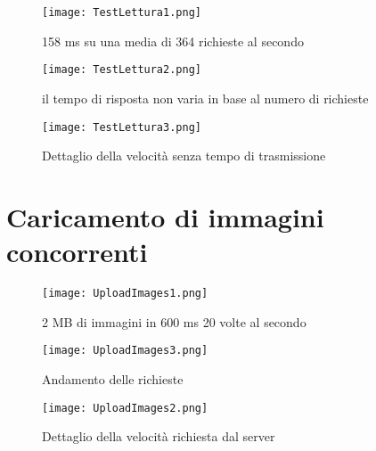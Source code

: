 \begin{figure}[htbp]
    \begin{center}
        \texttt{[image: TestLettura1.png]}
        \caption{158 ms su una media di 364 richieste al secondo}
    \end{center}
\end{figure}

\begin{figure}[htbp]
    \begin{center}
        \texttt{[image: TestLettura2.png]}
        \caption{il tempo di risposta non varia in base al numero di richieste}
    \end{center}
\end{figure}

\begin{figure}[htbp]
    \begin{center}
        \texttt{[image: TestLettura3.png]}
        \caption{Dettaglio della velocità senza tempo di trasmissione}
    \end{center}
\end{figure}
\clearpage
\section{Caricamento di immagini concorrenti}

\begin{figure}[htbp]
    \begin{center}
        \texttt{[image: UploadImages1.png]}
        \caption{2 MB di immagini in 600 ms 20 volte al secondo}  
    \end{center}
\end{figure}

\begin{figure}[htbp]
    \begin{center}
        \texttt{[image: UploadImages3.png]}
        \caption{Andamento delle richieste}  
    \end{center}
\end{figure}

\begin{figure}[htbp]
    \begin{center}
        \texttt{[image: UploadImages2.png]}
        \caption{Dettaglio della velocità richiesta dal server}
    \end{center}
\end{figure}


